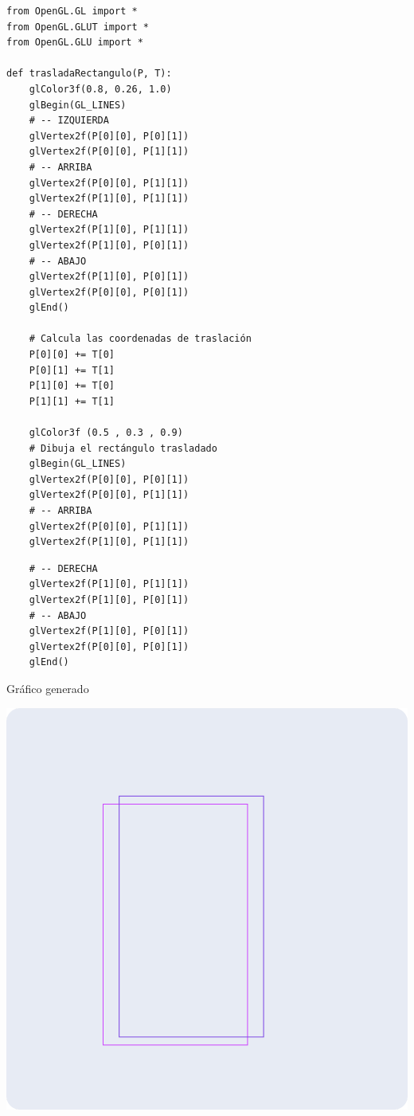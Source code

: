 \documentclass[a4paper]{article}
\begin{document}
\begin{center}
\begin{mycodebox}
\begin{lstlisting}
from OpenGL.GL import *
from OpenGL.GLUT import *
from OpenGL.GLU import *

def trasladaRectangulo(P, T):
    glColor3f(0.8, 0.26, 1.0)
    glBegin(GL_LINES)
    # -- IZQUIERDA
    glVertex2f(P[0][0], P[0][1])
    glVertex2f(P[0][0], P[1][1])
    # -- ARRIBA
    glVertex2f(P[0][0], P[1][1])
    glVertex2f(P[1][0], P[1][1])
    # -- DERECHA
    glVertex2f(P[1][0], P[1][1])
    glVertex2f(P[1][0], P[0][1])
    # -- ABAJO
    glVertex2f(P[1][0], P[0][1])
    glVertex2f(P[0][0], P[0][1])
    glEnd()

    # Calcula las coordenadas de traslación
    P[0][0] += T[0]
    P[0][1] += T[1]
    P[1][0] += T[0]
    P[1][1] += T[1] 

    glColor3f (0.5 , 0.3 , 0.9)
    # Dibuja el rectángulo trasladado
    glBegin(GL_LINES)
    glVertex2f(P[0][0], P[0][1])
    glVertex2f(P[0][0], P[1][1])
    # -- ARRIBA
    glVertex2f(P[0][0], P[1][1])
    glVertex2f(P[1][0], P[1][1])

\end{lstlisting}
\end{mycodebox}
\end{center}

\begin{center}
\begin{mycodebox}
\begin{lstlisting}
    # -- DERECHA
    glVertex2f(P[1][0], P[1][1])
    glVertex2f(P[1][0], P[0][1])
    # -- ABAJO
    glVertex2f(P[1][0], P[0][1])
    glVertex2f(P[0][0], P[0][1])
    glEnd()
\end{lstlisting}
\end{mycodebox}
\end{center}
Gráfico generado 
\begin{center}
\includegraphics[width=16cm]{src/2.png}
\end{center}
\newpage
\end{document}
